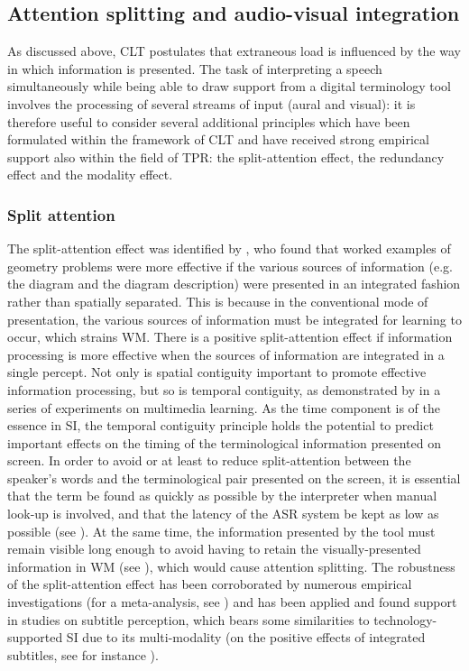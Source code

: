 \subsection{Attention splitting and audio-visual integration} \label{splitatt_audiovisual}
As discussed above, CLT postulates that extraneous load is influenced by the way in which information is presented. The task of interpreting a speech simultaneously while being able to draw support from a digital terminology tool involves the processing of several streams of input (aural and visual): it is therefore useful to consider several additional principles which have been formulated within the framework of CLT and have received strong empirical support also within the field of TPR: the split-attention effect, the redundancy effect and the modality effect.



\subsubsection{Split attention} \label{split_attention}
The split-attention effect was identified by \citet{tarmizi_guidance_1988}, who found that worked examples of geometry problems were more effective if the various sources of information (e.g. the diagram and the diagram description) were presented in an integrated fashion rather than spatially separated. This is because in the conventional mode of presentation, the various sources of information must be integrated for learning to occur, which strains WM. There is a positive split-attention effect if information processing is more effective when the sources of information are integrated in a single percept. Not only is spatial contiguity important to promote effective information processing, but so is temporal contiguity, as demonstrated by \citet{mayer_redundancy_2005} in a series of experiments on multimedia learning. As the time component is of the essence in SI, the temporal contiguity principle holds the potential to predict important effects on the timing of the terminological information presented on screen. In order to avoid or at least to reduce split-attention between the speaker's words and the terminological pair presented on the screen, it is essential that the term be found as quickly as possible by the interpreter when manual look-up is involved, and that the latency of the ASR system be kept as low as possible (see \citealt{montecchio_masterarbeit_maddalena_2021}). At the same time, the information presented by the tool must remain visible long enough to avoid having to retain the visually-presented information in WM (see ), which would cause attention splitting. The robustness of the split-attention effect has been corroborated by numerous empirical investigations (for a meta-analysis, see \citealt{ginns_meta-analysis_2005}) and has been applied and found support in studies on subtitle perception, which bears some similarities to technology-supported SI due to its multi-modality (on the positive effects of integrated subtitles, see for instance \citealt{fox_can_2018}).

